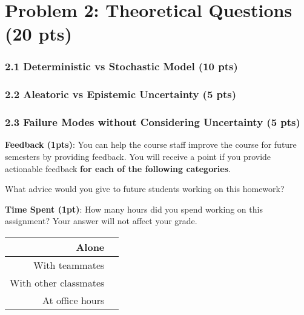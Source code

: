 \documentclass[12pt]{article}
\begin{document}
\section*{Problem 2: Theoretical Questions (20 pts)}

\subsubsection*{2.1 Deterministic vs Stochastic Model (10 pts)}
\begin{solution}[height=20cm]
\end{solution}

\subsubsection*{2.2 Aleatoric vs Epistemic Uncertainty (5 pts)}
\begin{solution}[height=20cm]
\end{solution}

\subsubsection*{2.3 Failure Modes without Considering Uncertainty (5 pts)}
\begin{solution}[height=20cm]
\end{solution}
\newpage
\textbf{Feedback (1pts)}: You can help the course staff improve the course for future semesters by providing feedback. You will receive a point if you provide actionable feedback \textbf{for each of the following categories}.

What advice would you give to future students working on this homework?
\begin{solution}[height=4cm]
\end{solution}

\noindent\textbf{Time Spent (1pt)}: How many hours did you spend working on this assignment? Your answer will not affect your grade.
\begin{table}[H]
    \centering
    \begin{tabular}{r|c}
        Alone &  \hspace{3em} %
        \\ \hline
        With teammates & \hspace{3em} %
        \\ \hline
        With other classmates & \hspace{3em} %
        \\ \hline
        At office hours & \hspace{3em} %
        \\ \hline
    \end{tabular}
\end{table}
\end{document}
